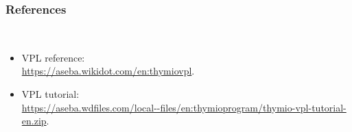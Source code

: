 \documentclass[a4paper]{leaflet}
\newcommand{\sct}[1]{\subsubsection{#1}\mbox{}\\}
\begin{document}
\vfill

\sct{References}

\begin{itemize}
\item VPL reference:\\
\url{https://aseba.wikidot.com/en:thymiovpl}.

\item VPL tutorial:\\
\url{https://aseba.wdfiles.com/local--files/en:thymioprogram/thymio-vpl-tutorial-en.zip}.

\end{itemize}
\end{document}
